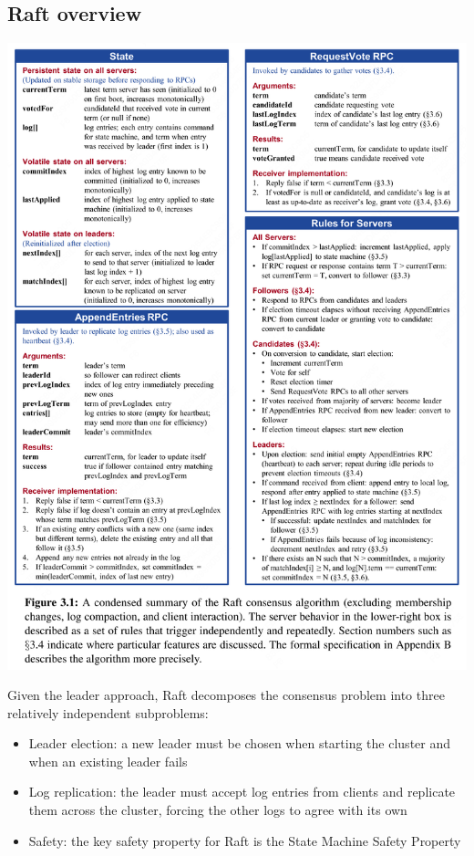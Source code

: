 \documentclass[11pt]{article}
\begin{document}
\subsection{Raft overview}
\label{sec:org7d0cb1f}
\begin{center}
\includegraphics[width=.99\textwidth]{../../images/papers/17.png}
\label{}
\end{center}
Given the leader approach, Raft decomposes the consensus problem into three relatively independent
subproblems:
\begin{itemize}
\item Leader election: a new leader must be chosen when starting the cluster and when an existing leader fails
\item Log replication: the leader must accept log entries from clients and replicate them across the cluster, forcing the other logs to agree with its own
\item Safety: the key safety property for Raft is the State Machine Safety Property
\end{itemize}
\end{document}
